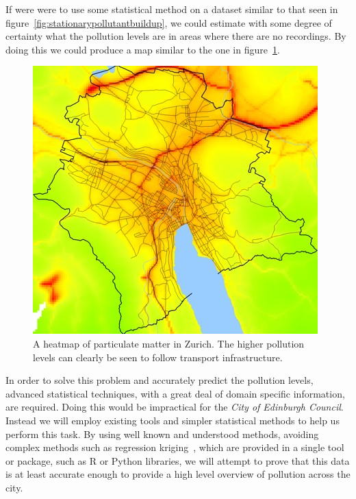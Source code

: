 	If were were to use some statistical method on a dataset similar to that seen in figure~\ref{fig:stationarypollutantbuildup}, we could estimate with some degree of certainty what the pollution levels are in areas where there are no recordings. By doing this we could produce a map similar to the one in figure~\ref{fig:zurichheatmap}.

	\begin{figure}[H]
	    \begin{center}
	        \includegraphics[width=\textwidth]{./images/zurichpm.jpg}
	        \caption{A heatmap of particulate matter in Zurich. The higher pollution levels can clearly be seen to follow transport infrastructure.~\cite{opensensezurich}}
	        \label{fig:zurichheatmap}
	    \end{center}
	\end{figure}

	
	In order to solve this problem and accurately predict the pollution levels, advanced statistical techniques, with a great deal of domain specific information, are required. Doing this would be impractical for the \emph{City of Edinburgh Council}. Instead we will employ existing tools and simpler statistical methods to help us perform this task. By using well known and understood methods, avoiding complex methods such as regression kriging~\cite{regressionkriging}, which are provided in a single tool or package, such as R or Python libraries, we will attempt to prove that this data is at least accurate enough to provide a high level overview of pollution across the city. 

